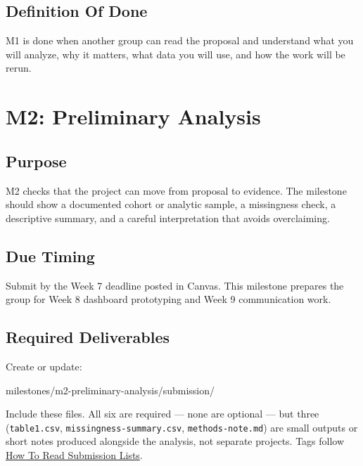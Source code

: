 \documentclass[
  letterpaper,
  DIV=11,
  numbers=noendperiod,
  oneside]{scrreprt}
\newenvironment{Shaded}{\begin{snugshade}}{\end{snugshade}}
\newcommand{\NormalTok}[1]{\textcolor[rgb]{0.00,0.23,0.31}{#1}}
\begin{document}
\section{Definition Of Done}\label{definition-of-done-22}

M1 is done when another group can read the proposal and understand what
you will analyze, why it matters, what data you will use, and how the
work will be rerun.

\chapter{M2: Preliminary Analysis}\label{m2-preliminary-analysis}

\section{Purpose}\label{purpose-15}

M2 checks that the project can move from proposal to evidence. The
milestone should show a documented cohort or analytic sample, a
missingness check, a descriptive summary, and a careful interpretation
that avoids overclaiming.

\section{Due Timing}\label{due-timing-2}

Submit by the Week 7 deadline posted in Canvas. This milestone prepares
the group for Week 8 dashboard prototyping and Week 9 communication
work.

\section{Required Deliverables}\label{required-deliverables-2}

Create or update:

\begin{Shaded}
\begin{Highlighting}[numbers=left,,]
\NormalTok{milestones/m2{-}preliminary{-}analysis/submission/}
\end{Highlighting}
\end{Shaded}

Include these files. All six are required --- none are optional --- but
three (\texttt{table1.csv}, \texttt{missingness-summary.csv},
\texttt{methods-note.md}) are small outputs or short notes produced
alongside the analysis, not separate projects. Tags follow
\hyperref[how-to-read-submission-lists]{How To Read Submission Lists}.
\end{document}
